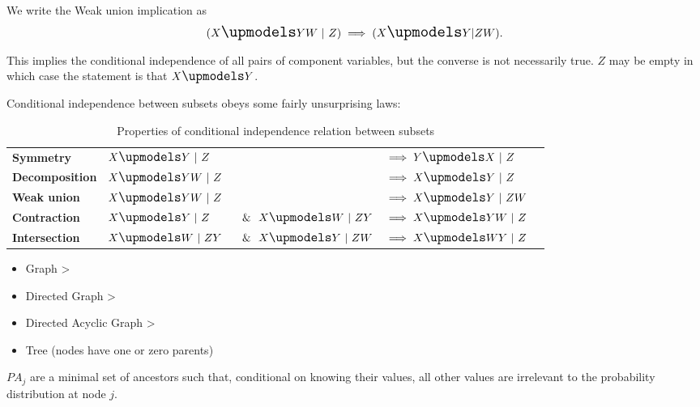 We write the Weak union implication as
  \begin{align*}
    (X \indep YW ~|~ Z) \implies (X \indep Y | ZW).
  \end{align*}









 This implies the conditional independence of all pairs of component variables,
but the converse is not necessarily true. $Z$ may be empty in which case the statement is that $X \indep Y$.

Conditional independence between subsets obeys some fairly unsurprising laws:

\begin{itemize}
  \begin{table}[!h]
    \centering
    \begin{tabular}{|l|l l l l}
      {\bf Symmetry}      & $X \indep Y  ~|~ Z $&$                            $&$\implies Y \indep X  ~|~ Z   $ & \\
      {\bf Decomposition} & $X \indep YW ~|~ Z $&$                           $&$\implies X \indep Y  ~|~ Z   $ &\\
      {\bf Weak union}    & $X \indep YW ~|~ Z $&$                           $&$\implies X \indep Y  ~|~ ZW  $ &\\
      {\bf Contraction}   & $X \indep Y  ~|~ Z  $&$ ~~\&~~ X \indep W ~|~ ZY  $&$\implies X \indep YW ~|~ Z   $ & \\
      {\bf Intersection}  & $X \indep W  ~|~ ZY $&$ ~~\&~~ X \indep Y ~|~ ZW  $&$\implies X \indep WY ~|~ Z   $ &
  \end{tabular}
    \caption{Properties of conditional independence relation between subsets}
  \end{table}
\end{itemize}

\begin{itemize}
\item Graph >
\item Directed Graph >
\item Directed Acyclic Graph >
\item Tree (nodes have one or zero parents)
\end{itemize}

\begin{definition}[Parent]
 $PA_j$ are a minimal set of ancestors such that, conditional on knowing their values, all other
values are irrelevant to the probability distribution at node $j$.
\end{definition}

